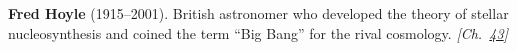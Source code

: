 \textbf{Fred Hoyle} (1915–2001). British astronomer who developed the theory of stellar nucleosynthesis and coined the term ``Big Bang'' for the rival cosmology. \emph{[Ch.~\hyperref[ch:nearflatuniverse]{43}]}

